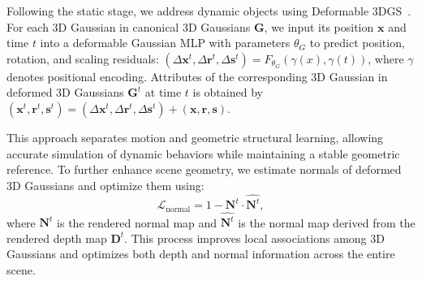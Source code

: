 \vspace{3pt}  
Following the static stage, we address dynamic objects using Deformable 3DGS~\cite{yang2023deformable}. For each 3D Gaussian in canonical 3D Gaussians $\textbf{G}$, we input its position $\bm{x}$ and time $t$ into a deformable Gaussian MLP with parameters $\theta_{\textit{G}}$ to predict position, rotation, and scaling residuals: $(\Delta\bm{x}^t,\Delta\bm{r}^t,\Delta\bm{s}^t) = F_{\theta_G}(\gamma(x), \gamma(t))$, where $\gamma$ denotes positional encoding. 
Attributes of the corresponding 3D Gaussian in deformed 3D Gaussians $\textbf{G}^t$ at time $t$ is obtained by $(\bm{x}^t,\bm{r}^t,\bm{s}^t)=(\Delta\bm{x}^t,\Delta\bm{r}^t,\Delta\bm{s}^t) + (\bm{x},\bm{r},\bm{s}).$

This approach separates motion and geometric structural learning, allowing accurate simulation of dynamic behaviors while maintaining a stable geometric reference.
To further enhance scene geometry, we estimate normals of deformed 3D Gaussians and optimize them using: 
\begin{equation}
\mathcal{L}_{\text{normal}} = 1 - {\mathbf{N}^t}\cdot\hat{\mathbf{N}^t},
\end{equation}
where ${\mathbf{N}^t}$ is the rendered normal map and $\hat{\mathbf{N}^t}$ is the normal map derived from the rendered depth map ${\mathbf{D}^t}$. This process improves local associations among 3D Gaussians and optimizes both depth and normal information across the entire scene.


